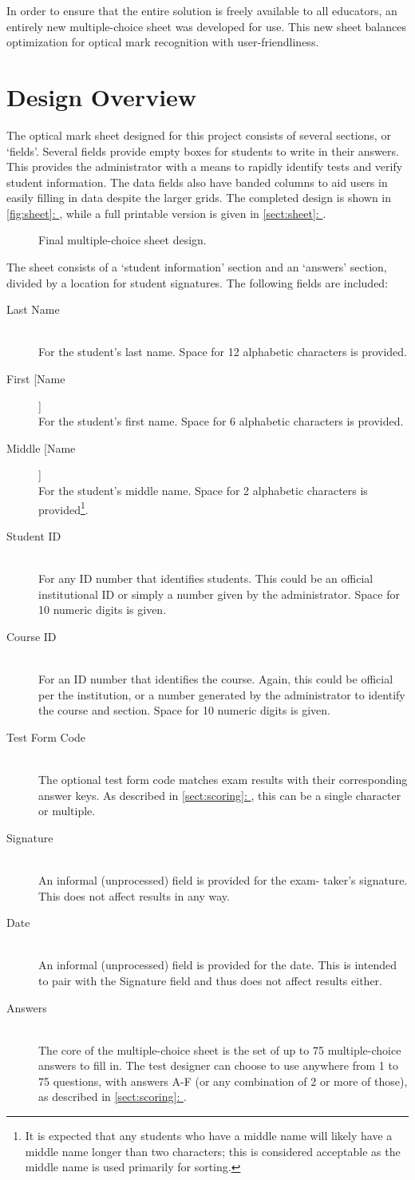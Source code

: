 \documentclass[12pt, letterpaper]{report}
\newcommand*{\sectref}[1]{\hypersetup{linkcolor=usfgreen}\hyperref[{#1}]{\ref*{#1}: \nameref*{#1}}}
\newcommand*{\itemref}[1]{\hypersetup{linkcolor=usfgreen}\hyperref[{#1}]{\autoref*{#1}: \nameref*{#1}}}
\newcommand*{\boxedimage}[1]{\fbox{\texttt{[image: img/\#1]}}}
\newcommand{\fig}[3]{
  \begin{figure}[h]
    \caption{#1}
    \label{#3}
    \centering
    \boxedimage{#2}
  \end{figure}
}
\newcommand*{\descitem}[1]{\item[#1] \hfill \\ }
\begin{document}
In order to ensure that the entire solution is freely available to all
educators, an entirely new multiple-choice sheet was developed for use.
This new sheet balances optimization for optical mark recognition with
user-friendliness.

\section{Design Overview}
The optical mark sheet designed for this project consists of several sections,
or `fields'. Several fields provide empty boxes for students to write in their
answers. This provides the administrator with a means to rapidly identify tests
and verify student information. The data fields
also have banded columns to aid users in easily filling in data despite the
larger grids. The completed design is shown in
\itemref{fig:sheet}, while a full printable version is given in \sectref{sect:sheet}.

\fig{Final multiple-choice sheet design.}{sheet.png}{fig:sheet}

The sheet consists of a `student information' section and an `answers' section,
divided by a location for student signatures. The following fields are
included:
\begin{description}
  \descitem{Last Name} For the student's last name. Space for 12 alphabetic
  characters is provided.
  \descitem{First [Name]} For the student's first name. Space for 6 alphabetic
  characters is provided.
  \descitem{Middle [Name]} For the student's middle name. Space for 2 alphabetic
  characters is provided\footnote{It is expected that any students who have a
  middle name will likely have a middle name longer than two characters; this
  is considered acceptable as the middle name is used primarily for sorting.}.
  \descitem{Student ID} For any ID number that identifies students. This could be an
  official institutional ID or simply a number given by the administrator. Space
  for 10 numeric digits is given.
  \descitem{Course ID} For an ID number that identifies the course. Again, this
  could be official per the institution, or a number generated by the
  administrator to identify the course and section. Space for 10 numeric digits
  is given.
  \descitem{Test Form Code} The optional test form code matches exam results with
  their corresponding answer keys. As described in \sectref{sect:scoring}, this can
  be a single character or multiple.
  \descitem{Signature} An informal (unprocessed) field is provided for the exam-
  taker's signature. This does not affect results in any way.
  \descitem{Date} An informal (unprocessed) field is provided for the date. This is
  intended to pair with the Signature field and thus does not affect results
  either.
  \descitem{Answers} The core of the multiple-choice sheet is the set of up to 75
  multiple-choice answers to fill in. The test designer can choose to use
  anywhere from 1 to 75 questions, with answers A-F (or any combination of 2 or
  more of those), as described in \sectref{sect:scoring}.
\end{description}
\end{document}
